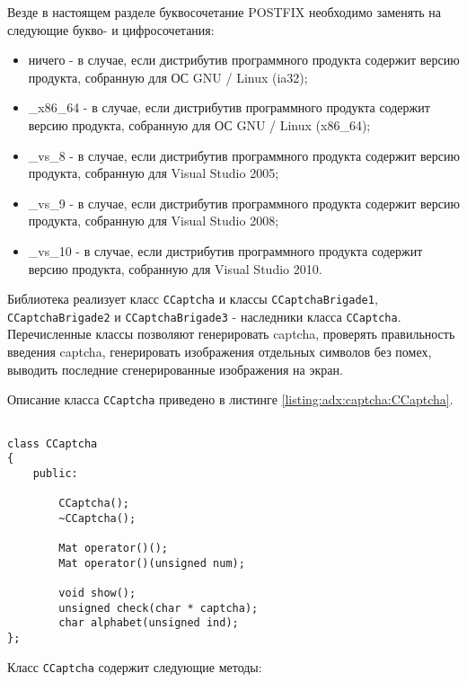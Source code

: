 
Везде в настоящем разделе буквосочетание POSTFIX необходимо заменять на следующие букво- и цифросочетания:

\begin{itemize}

	\item ничего - в случае, если дистрибутив программного продукта содержит версию продукта, собранную для ОС GNU / Linux (ia32);
	\item \_x86\_64 - в случае, если дистрибутив программного продукта содержит версию продукта, собранную для ОС GNU / Linux (x86\_64);
	\item \_vs\_8 - в случае, если дистрибутив программного продукта содержит версию продукта, собранную для Visual Studio 2005;
	\item \_vs\_9 - в случае, если дистрибутив программного продукта содержит версию продукта, собранную для Visual Studio 2008;
	\item \_vs\_10 - в случае, если дистрибутив программного продукта содержит версию продукта, собранную для Visual Studio 2010.

\end{itemize}


Библиотека реализует класс \verb|CCaptcha| и классы \verb|CCaptchaBrigade1|, \verb|CCaptchaBrigade2| и \verb|CCaptchaBrigade3| - наследники класса \verb|CCaptcha|. Перечисленные классы позволяют генерировать captcha, проверять правильность введения captcha, генерировать изображения отдельных символов без помех, выводить последние сгенерированные изображения на экран.

Описание класса \verb|CCaptcha| приведено в листинге \ref{listing:adx:captcha:CCaptcha}.

\begin{lstlisting}

class CCaptcha
{
	public:

		CCaptcha();
		~CCaptcha();

		Mat operator()();
		Mat operator()(unsigned num);

		void show();
		unsigned check(char * captcha);
		char alphabet(unsigned ind);
};

\end{lstlisting}
\mylistingend

Класс \verb|CCaptcha| содержит следующие методы:


